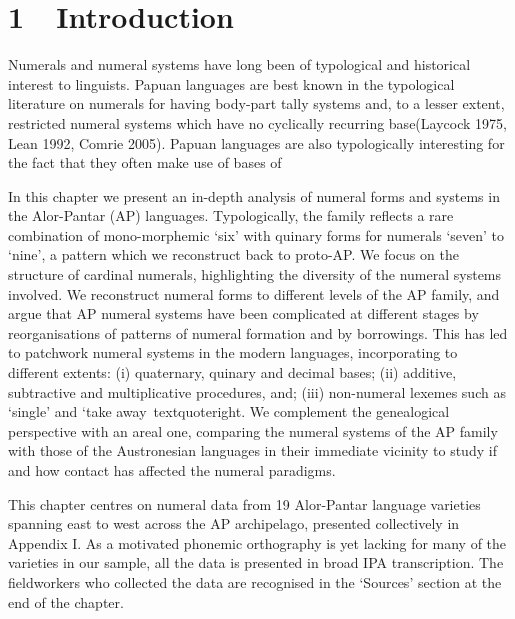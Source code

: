 \section[1\ \ Introduction]{1\ \ Introduction}
\hypertarget{Toc376958477}{}Numerals and numeral systems have long been of typological and historical interest to linguists. Papuan languages are best known in the typological literature on numerals for having body-part tally systems and, to a lesser extent, restricted numeral systems which have no cyclically recurring base\textstylefootnotereference{ }(Laycock 1975, Lean 1992, Comrie 2005). Papuan languages are also typologically interesting for the fact that they often make use of bases of 

In this chapter we present an in-depth analysis of numeral forms and systems in the Alor-Pantar (AP) languages. Typologically, the family reflects a rare combination of mono-morphemic {\textquoteleft}six{\textquoteright} with quinary forms for numerals {\textquoteleft}seven{\textquoteright} to {\textquoteleft}nine{\textquoteright}, a pattern which we reconstruct back to proto-AP. We focus on the structure of cardinal numerals, highlighting the diversity of the numeral systems involved. We reconstruct numeral forms to different levels of the AP family, and argue that AP numeral systems have been complicated at different stages by reorganisations of patterns of numeral formation and by borrowings. This has led to patchwork numeral systems in the modern languages, incorporating to different extents: (i) quaternary, quinary and decimal bases; (ii) additive, subtractive and multiplicative procedures, and; (iii) non-numeral lexemes such as {\textquoteleft}single{\textquoteright} and {\textquoteleft}take away{\
textquoteright}. We complement the genealogical perspective with an areal one, comparing the numeral systems of the AP family with those of the Austronesian languages in their immediate vicinity to study if and how contact has affected the numeral paradigms.

This chapter centres on numeral data from 19 Alor-Pantar language varieties spanning east to west across the AP archipelago, presented collectively in Appendix I. As a motivated phonemic orthography is yet lacking for many of the varieties in our sample, all the data is presented in broad IPA transcription. The fieldworkers who collected the data are recognised in the {\textquoteleft}Sources{\textquoteright} section at the end of the chapter. 

